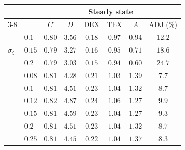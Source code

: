 \begin{tabular}{llcccccc}
\hline
 &  & \multicolumn{6}{c}{Steady state} \\
\cline{3-8}
 &  & $C$ & $D$ & $\mathrm{DEX}$ & $\mathrm{TEX}$ & $A$ & $\mathrm{ADJ}$ (\%) \\
\hline
\multirow{3}{*}{$\sigma_\zeta$} & $0.1$ & $0.80$ & $3.56$ & $0.18$ & $0.97$ & $0.94$ & $12.2$ \\
 & $0.15$ & $0.79$ & $3.27$ & $0.16$ & $0.95$ & $0.71$ & $18.6$ \\
 & $0.2$ & $0.79$ & $3.03$ & $0.15$ & $0.94$ & $0.60$ & $24.7$ \\
\addlinespace
\multirow{3}{*}{$\sigma_p$ ($S=0.2$)} & $0.08$ & $0.81$ & $4.28$ & $0.21$ & $1.03$ & $1.39$ & $7.7$ \\
 & $0.1$ & $0.81$ & $4.51$ & $0.23$ & $1.04$ & $1.32$ & $8.7$ \\
 & $0.12$ & $0.82$ & $4.87$ & $0.24$ & $1.06$ & $1.27$ & $9.9$ \\
\addlinespace
\multirow{3}{*}{$S$ ($\sigma_p=0.1$)} & $0.15$ & $0.81$ & $4.59$ & $0.23$ & $1.04$ & $1.27$ & $9.3$ \\
 & $0.2$ & $0.81$ & $4.51$ & $0.23$ & $1.04$ & $1.32$ & $8.7$ \\
 & $0.25$ & $0.81$ & $4.45$ & $0.22$ & $1.04$ & $1.37$ & $8.3$ \\
\hline
\end{tabular}
